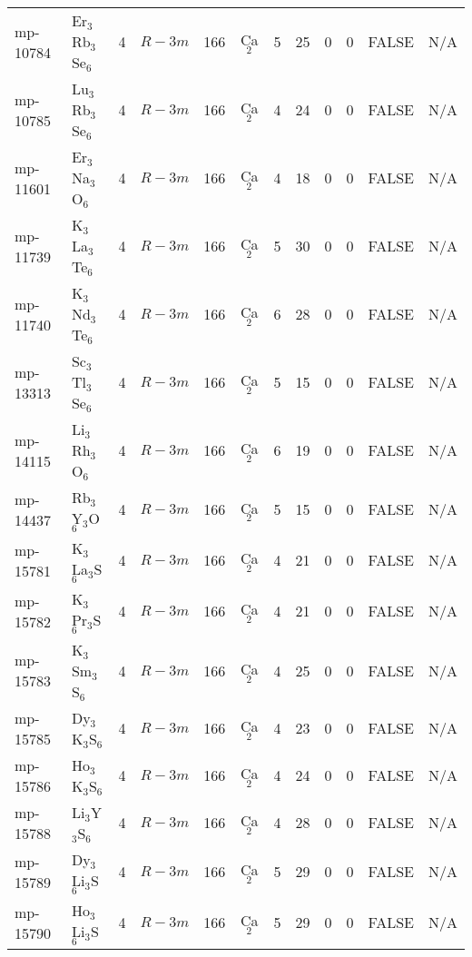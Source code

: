 {\begin{longtable}{llcccccccccc}
    mp-10784 & Er$_{3}$Rb$_{3}$Se$_{6}$ & 4     & $R-3m$ & 166   & Ca$_{2}$ & 5     & 25    & 0     & 0     & FALSE & N/A \\
    mp-10785 & Lu$_{3}$Rb$_{3}$Se$_{6}$ & 4     & $R-3m$ & 166   & Ca$_{2}$ & 4     & 24    & 0     & 0     & FALSE & N/A \\
    mp-11601 & Er$_{3}$Na$_{3}$O$_{6}$ & 4     & $R-3m$ & 166   & Ca$_{2}$ & 4     & 18    & 0     & 0     & FALSE & N/A \\
    mp-11739 & K$_{3}$La$_{3}$Te$_{6}$ & 4     & $R-3m$ & 166   & Ca$_{2}$ & 5     & 30    & 0     & 0     & FALSE & N/A \\
    mp-11740 & K$_{3}$Nd$_{3}$Te$_{6}$ & 4     & $R-3m$ & 166   & Ca$_{2}$ & 6     & 28    & 0     & 0     & FALSE & N/A \\
    mp-13313 & Sc$_{3}$Tl$_{3}$Se$_{6}$ & 4     & $R-3m$ & 166   & Ca$_{2}$ & 5     & 15    & 0     & 0     & FALSE & N/A \\
    mp-14115 & Li$_{3}$Rh$_{3}$O$_{6}$ & 4     & $R-3m$ & 166   & Ca$_{2}$ & 6     & 19    & 0     & 0     & FALSE & N/A \\
    mp-14437 & Rb$_{3}$Y$_{3}$O$_{6}$ & 4     & $R-3m$ & 166   & Ca$_{2}$ & 5     & 15    & 0     & 0     & FALSE & N/A \\
    mp-15781 & K$_{3}$La$_{3}$S$_{6}$ & 4     & $R-3m$ & 166   & Ca$_{2}$ & 4     & 21    & 0     & 0     & FALSE & N/A \\
    mp-15782 & K$_{3}$Pr$_{3}$S$_{6}$ & 4     & $R-3m$ & 166   & Ca$_{2}$ & 4     & 21    & 0     & 0     & FALSE & N/A \\
    mp-15783 & K$_{3}$Sm$_{3}$S$_{6}$ & 4     & $R-3m$ & 166   & Ca$_{2}$ & 4     & 25    & 0     & 0     & FALSE & N/A \\
    mp-15785 & Dy$_{3}$K$_{3}$S$_{6}$ & 4     & $R-3m$ & 166   & Ca$_{2}$ & 4     & 23    & 0     & 0     & FALSE & N/A \\
    mp-15786 & Ho$_{3}$K$_{3}$S$_{6}$ & 4     & $R-3m$ & 166   & Ca$_{2}$ & 4     & 24    & 0     & 0     & FALSE & N/A \\
    mp-15788 & Li$_{3}$Y$_{3}$S$_{6}$ & 4     & $R-3m$ & 166   & Ca$_{2}$ & 4     & 28    & 0     & 0     & FALSE & N/A \\
    mp-15789 & Dy$_{3}$Li$_{3}$S$_{6}$ & 4     & $R-3m$ & 166   & Ca$_{2}$ & 5     & 29    & 0     & 0     & FALSE & N/A \\
    mp-15790 & Ho$_{3}$Li$_{3}$S$_{6}$ & 4     & $R-3m$ & 166   & Ca$_{2}$ & 5     & 29    & 0     & 0     & FALSE & N/A \\

\end{longtable}}
